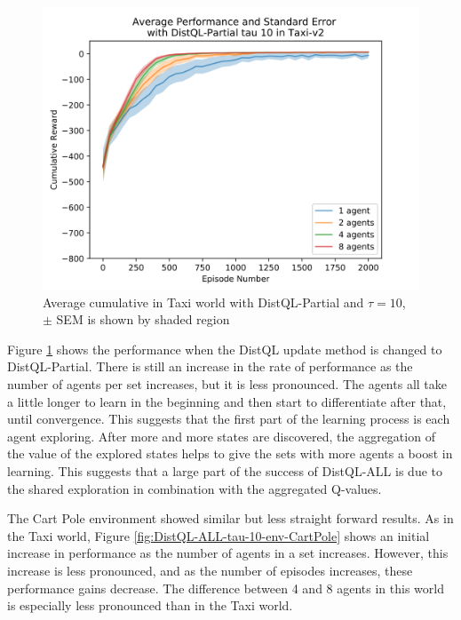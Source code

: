 \documentclass[jair,twoside,11pt,theapa]{article}
\begin{document}
\begin{figure}[h]
\begin{minipage}{.4\textwidth}
	\includegraphics[width=1\linewidth]{resultImages/binned-Average-Performance-and-Standard-Error-with-DistQL-Partial-tau-10-in-Taxi-v2}
	\caption{Average cumulative in Taxi world with DistQL-Partial and $\tau=10$, $\pm$ SEM is shown by shaded region}
	\label{fig:DistQL-Partial-tau-10-env-Taxi}
\end{minipage}
\end{figure}

Figure \ref{fig:DistQL-Partial-tau-10-env-Taxi} shows the performance when the DistQL update method is changed to DistQL-Partial. There is still an increase in the rate of performance as the number of agents per set increases, but it is less pronounced. The agents all take a little longer to learn in the beginning and then start to differentiate after that, until convergence. This suggests that the first part of the learning process is each agent exploring. After more and more states are discovered, the aggregation of the value of the explored states helps to give the sets with more agents a boost in learning. This suggests that a large part of the success of DistQL-ALL is due to the shared exploration in combination with the aggregated Q-values. 

The Cart Pole environment showed similar but less straight forward results. As in the Taxi world, Figure \ref{fig:DistQL-ALL-tau-10-env-CartPole} shows an initial increase in performance as the number of agents in a set increases. However, this increase is less pronounced, and as the number of episodes increases, these performance gains decrease. The difference between 4 and 8 agents in this world is especially less pronounced than in the Taxi world. 
\end{document}
